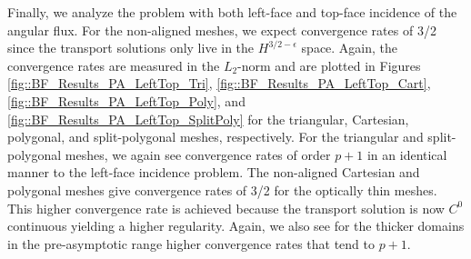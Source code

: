 Finally, we analyze the problem with both left-face and top-face incidence of the angular flux. For the non-aligned meshes, we expect convergence rates of 3/2 since the transport solutions only live in the $H^{3/2-\epsilon}$ space. Again, the convergence rates are measured in the $L_2$-norm and are plotted in Figures \ref{fig::BF_Results_PA_LeftTop_Tri}, \ref{fig::BF_Results_PA_LeftTop_Cart}, \ref{fig::BF_Results_PA_LeftTop_Poly}, and \ref{fig::BF_Results_PA_LeftTop_SplitPoly} for the triangular, Cartesian, polygonal, and split-polygonal meshes, respectively. For the triangular and split-polygonal meshes, we again see convergence rates of order $p+1$ in an identical manner to the left-face incidence problem. The non-aligned Cartesian and polygonal meshes give convergence rates of 3/2 for the optically thin meshes. This higher convergence rate is achieved because the transport solution is now $C^0$ continuous yielding a higher regularity. Again, we also see for the thicker domains in the pre-asymptotic range higher convergence rates that tend to $p+1$.

